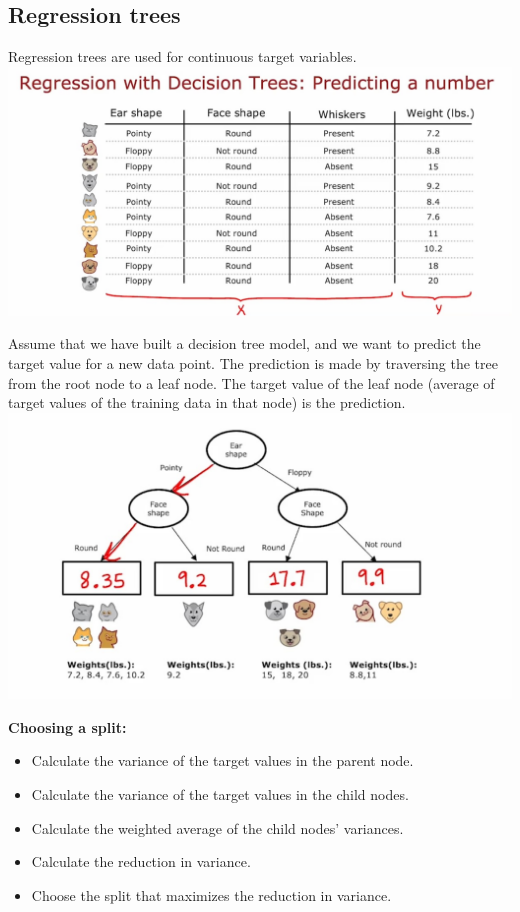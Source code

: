 \subsection*{Regression trees}
Regression trees are used for continuous target variables.\\
\includegraphics*[width=\textwidth]{images/11.11}
\par
Assume that we have built a decision tree model, 
and we want to predict the target value for a new data point.
The prediction is made by traversing the tree from the root node to a leaf node.
The target value of the leaf node (average of target values of the training data in that node) is the prediction.\\
\includegraphics*[width=\textwidth]{images/11.10}
\par
\noindent
{\large \textbf{Choosing a split:}}\par
\begin{itemize}
    \item Calculate the variance of the target values in the parent node.
    \item Calculate the variance of the target values in the child nodes.
    \item Calculate the weighted average of the child nodes' variances.
    \item Calculate the reduction in variance.
    \item Choose the split that maximizes the reduction in variance.
\end{itemize}
